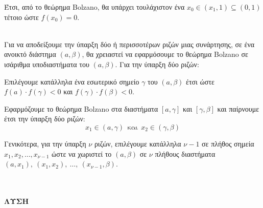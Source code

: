 \documentclass[twoside,nofonts,ektypwsh]{frontisthrio}
\begin{document}
Έτσι, από το θεώρημα Bolzano, θα υπάρχει τουλάχιστον ένα $ x_0\in(x_1,1)\subseteq(0,1) $ τέτοιο ώστε $ f(x_0)=0 $.\\\\
\begin{Methodos}{5cm}
Για να αποδείξουμε την ύπαρξη δύο ή περισσοτέρων ριζών μιας συνάρτησης, σε ένα ανοικτό διάστημα $ (a,\beta) $, θα χρειαστεί να εφαρμόσουμε το θεώρημα Bolzano σε ισάριθμα υποδιαστήματα του $ (a,\beta) $. Για την ύπαρξη δύο ριζών:
\begin{bhma}
\item Επιλέγουμε κατάλληλα ένα εσωτερικό σημείο $ \gamma $ του $ (a,\beta) $ έτσι ώστε $ f(a)\cdot f(\gamma)<0 $ και $ f(\gamma)\cdot f(\beta)<0 $.
\item Εφαρμόζουμε το θεώρημα Bolzano στα διαστήματα $ [a,\gamma] $ και $ [\gamma,\beta] $ και παίρνουμε έτσι την ύπαρξη δύο ριζών:
\[ x_1\in(a,\gamma)\ \ \textrm{και}\ \ x_2\in(\gamma,\beta) \]
\end{bhma}
Γενικότερα, για την ύπαρξη $ \nu $ ριζών, επιλέγουμε κατάλληλα $ \nu-1 $ σε πλήθος σημεία $ x_1,x_2,\ldots,x_{\nu-1} $ ώστε να χωριστεί το $ (a,\beta) $ σε $ \nu $ πλήθους διαστήματα $ (a,x_1),\ (x_1,x_2),\ \ldots,\ (x_{\nu-1},\beta) $.
\end{Methodos}
\noindent
{}
\\\\
\textbf{ΛΥΣΗ}\\
\end{document}
